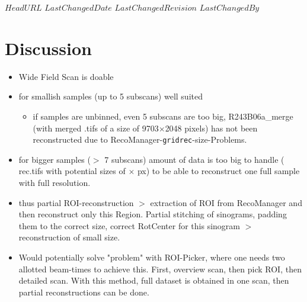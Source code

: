 \svnidlong
{$HeadURL$}
{$LastChangedDate$}
{$LastChangedRevision$}
{$LastChangedBy$}
\section{Discussion}
\begin{itemize}
	\item Wide Field Scan is doable
	\item for smallish samples (up to 5 subscans) well suited
	\begin{itemize}
		\item if samples are unbinned, even 5 subscans are too big, R243B06a\_merge (with merged .tifs of a size of 9703$\times$2048 pixels) has not been reconstructed due to RecoManager-\verb+gridrec+-size-Problems.
	\end{itemize}
	\item for bigger samples ($>$ 7 subscans) amount of data is too big to handle ( rec.tifs with potential sizes of $\times$ px) to be able to reconstruct one full sample with full resolution.
	\item thus partial ROI-reconstruction $>$ extraction of ROI from RecoManager and then reconstruct only this Region. Partial stitching of sinograms, padding them to the correct size, correct RotCenter for this sinogram $>$ reconstruction of small size.
	\item Would potentially solve "problem" with ROI-Picker, where one needs two allotted beam-times to achieve this. First, overview scan, then pick ROI, then detailed scan. With this method, full dataset is obtained in one scan, then partial reconstructions can be done.
\end{itemize}
